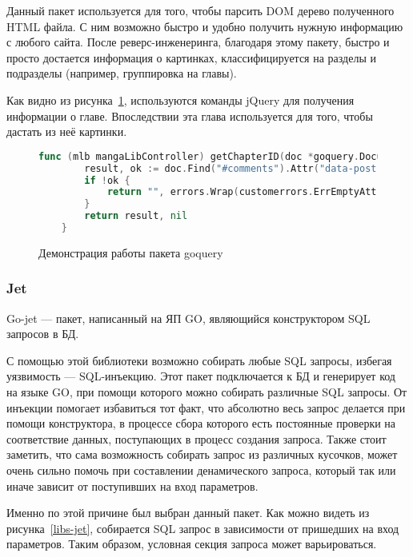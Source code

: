 Данный пакет используется для того, чтобы парсить DOM дерево полученного HTML файла. С ним возможно быстро и удобно получить нужную информацию с любого сайта.
После реверс-инженеринга, благодаря этому пакету, быстро и просто достается информация о картинках, классифицируется на разделы и подразделы (например, группировка на главы).

Как видно из рисунка~\ref{libs-goquery}, используются команды jQuery для получения информации о главе. 
Впоследствии эта глава используется для того, чтобы дастать из неё картинки.

\begin{figure}
	\begin{lstlisting}[language=go]
	func (mlb mangaLibController) getChapterID(doc *goquery.Document) (string, error) {
		result, ok := doc.Find("#comments").Attr("data-post-id")
		if !ok {
			return "", errors.Wrap(customerrors.ErrEmptyAttr, "mangalib: data-post-id")
		}
		return result, nil
	}
	\end{lstlisting}
	\caption{Демонстрация работы пакета goquery}
	\label{libs-goquery}
\end{figure}

\subsubsection{Jet} \label{jet-section}
Go-jet \cite{jet-cite} --- пакет, написанный на ЯП GO, являющийся конструктором SQL запросов в БД.

С помощью этой библиотеки возможно собирать любые SQL запросы, избегая уязвимость --- SQL-инъекцию. 
Этот пакет подключается к БД и генерирует код на языке GO, при помощи которого можно собирать различные SQL запросы.
От инъекции помогает избавиться тот факт, что абсолютно весь запрос делается при помощи конструктора, в процессе сбора которого есть постоянные проверки на соответствие данных,
поступающих в процесс создания запроса.
Также стоит заметить, что сама возможность собирать запрос из различных кусочков, может очень сильно помочь при составлении денамического запроса, который так или иначе зависит от поступивших на вход параметров.

Именно по этой причине был выбран данный пакет.
Как можно видеть из рисунка~\ref{libs-jet}, собирается SQL запрос в зависимости от пришедших на вход параметров. 
Таким образом, условная секция запроса может варьироваться.

